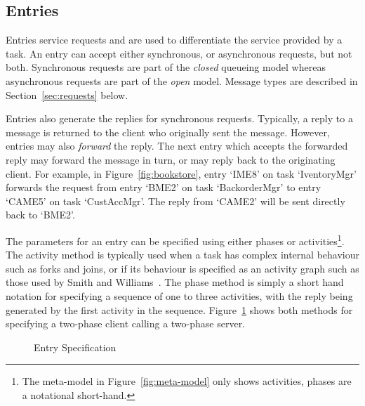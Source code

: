 \subsection{Entries}
\label{sec:entries}

Entries service requests and are used to
differentiate the service provided by a task.  An entry can accept
either synchronous, or
asynchronous requests, but not both.
Synchronous requests are part of the \emph{closed} queueing
model whereas
asynchronous requests are part of the \emph{open} 
model.  Message types are
described in Section~\ref{sec:requests} below.

Entries also generate the replies for synchronous
requests.  Typically, a reply to a message is
returned to the client who originally sent the message.  However,
entries may also \emph{forward} the reply.  The next
entry which accepts the forwarded reply may forward the message in
turn, or may reply back to the originating client.  For example, in
Figure~\ref{fig:bookstore}, entry `IME8' on task `IventoryMgr'
forwards the request from entry `BME2' on task `BackorderMgr' to entry
`CAME5' on task `CustAccMgr'.  The reply from `CAME2' will be sent
directly back to `BME2'.

The parameters for an entry can be specified using either
phases or activities\footnote{The
  meta-model in Figure~\protect\ref{fig:meta-model} only shows
  activities, phases are a notational short-hand.}.  The activity
method is typically used when a task has complex internal behaviour
such as forks and joins, or if its behaviour
is specified as an activity graph such as those
used by Smith and Williams~\cite{perf:smith-2002}.  The phase method
is simply a short hand notation for specifying a sequence of one to
three activities, with the
reply being generated by the
first activity in the sequence.  Figure~\ref{fig:entry-specification}
shows both methods for specifying a two-phase client calling a
two-phase server.

\begin{figure}[htbp]
  \centering
  \caption{Entry Specification}
  \label{fig:entry-specification}
\end{figure}

